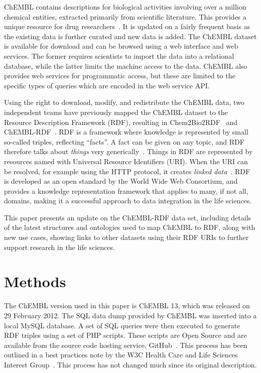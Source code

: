 \documentclass[10pt]{bmc_article}
\newenvironment{bmcformat}{\begin{raggedright}\baselineskip20pt\sloppy\setboolean{publ}{false}}{\end{raggedright}\baselineskip20pt\sloppy}
\begin{document}
\begin{bmcformat}
ChEMBL contains descriptions for biological activities involving over a million chemical 
entities, extracted primarily from scientific literature. This provides a unique resource for drug researchers~\cite{Gaulton2012,Warr2009}.
It is updated on a fairly frequent basis as the existing data is further curated and new data is added. 
The ChEMBL dataset is available for download and can be browsed using a web interface and web services.
The former requires scientists to import the data into a relational database, while the 
latter limits the machine access to the data. ChEMBL also provides web services for programmatic
access, but these are limited to the specific types of queries which are encoded in the web service API. 

Using the right to download, modify, and redistribute the ChEMBL data, two independent teams
have previously mapped the ChEMBL dataset to the Resource Description Framework (RDF), resulting
in Chem2Bio2RDF~\cite{Chen2010} and ChEMBL-RDF~\cite{Willighagen2011}. RDF is a framework where
knowledge is represented by small so-called triples, reflecting ``facts''. A fact can
be given on any topic, and RDF therefore talks about \textit{things} very generically~\cite{Miller:04:RP}. Things in RDF
are represented by resources named with Universal Resource Identifiers (URI). When the URI can be resolved, 
for example using the HTTP protocol, it creates \emph{linked data}~\cite{Samwald2011}. RDF is
developed as an open standard by the World Wide Web Consortium, and provides a knowledge
representation framework that applies to many, if not all, domains, making it a successful 
approach to data integration in the life sciences.

This paper presents an update on the ChEMBL-RDF data set, including details of the latest structures
and ontologies used to map ChEMBL to RDF, along with new use cases, showing 
links to other datasets using their RDF URIs to further support research in the life sciences.

\section*{Methods}
\label{s2}

The ChEMBL version used in this paper is ChEMBL 13, which was released on 29 February 2012.
The SQL data dump provided by ChEMBL was inserted into a local MySQL database. A set of SQL queries 
were then executed to generate RDF triples using a set of PHP scripts. These scripts are Open Source 
and are available from the source code hosting service, GitHub~\cite{ChEMBLRDFGitHub}. This process 
has been outlined in a best practices note by the W3C Health Care and Life Sciences Interest
Group~\cite{Marshall2012}. This process has not changed much since its original description.


\end{bmcformat}
\end{document}
